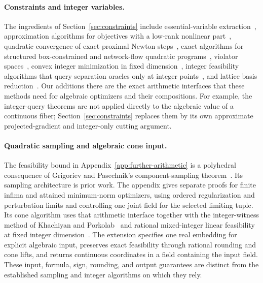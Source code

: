 \paragraph{Constraints and integer variables.}
The ingredients of Section~\ref{sec:constraints} include essential-variable
extraction~\cite{Carlini2006}, approximation algorithms for objectives with a
low-rank nonlinear part~\cite{MittalSchulz2013,KannanRademacher2009},
quadratic convergence of exact proximal Newton
steps~\cite{LeeSunSaunders2014}, exact algorithms for structured
box-constrained and network-flow quadratic
programs~\cite{PangHan2023,Vegh2016}, violator
spaces~\cite{GaertnerMatousekRuestSkovron2008}, convex integer minimization
in fixed dimension~\cite{HildebrandKoeppe2013}, integer feasibility
algorithms that query separation oracles only at integer
points~\cite{AriHildebrand2026,HildebrandGoess2024,Basu2023Integers}, and
lattice basis reduction~\cite{LenstraLenstraLovasz1982}. Our additions there
are the exact arithmetic interfaces that these methods need for algebraic
optimizers and their compositions. For example, the integer-query theorems
are not applied directly to the algebraic value of a continuous fiber;
Section~\ref{sec:constraints} replaces them by its own approximate
projected-gradient and integer-only cutting argument.

\paragraph{Quadratic sampling and algebraic cone input.}
The feasibility bound in Appendix~\ref{app:further-arithmetic} is a
polyhedral consequence of Grigoriev and Pasechnik's
component-sampling theorem~\cite[Theorem~1.2]{GrigorievPasechnik2005}.
Its sampling architecture is prior work. The appendix gives separate
proofs for finite infima and attained minimum-norm optimizers, using ordered
regularization and perturbation limits and controlling one joint field for
the selected limiting tuple. Its cone algorithm uses that arithmetic
interface together with the integer-witness method of Khachiyan and
Porkolab~\cite[Theorem~1.1]{KhachiyanPorkolab2000} and rational mixed-integer linear
feasibility at fixed integer dimension~\cite[Section~5]{Lenstra1983}.
The extension specifies one real embedding for explicit algebraic input,
preserves exact feasibility through rational rounding and cone lifts, and
returns continuous coordinates in a field containing the input field.
These input, formula, sign, rounding, and output guarantees are distinct
from the established sampling and integer algorithms on which they rely.

